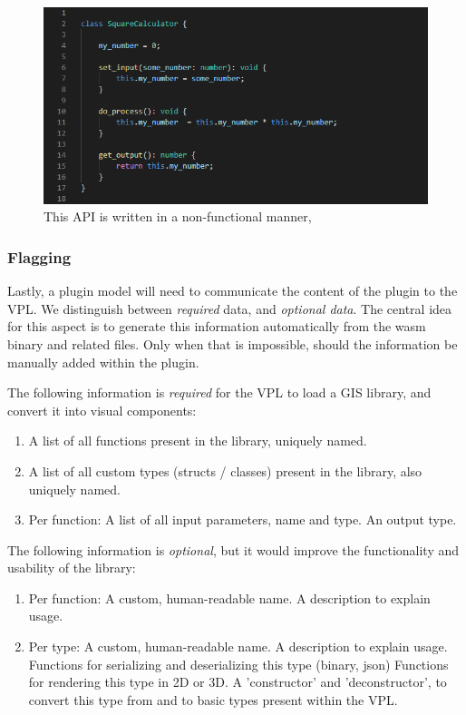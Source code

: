 \begin{figure}
  \centering
  \graphicspath{ {../../assets/images/6/3/} }
  \includegraphics[width=\linewidth]{ugly-oop.png}
  \caption[]{This API is written in a non-functional manner, }
  \label{fig:oop-considered-harmful}
\end{figure}

\subsubsection{Flagging}

Lastly, a plugin model will need to communicate the content of the plugin to the VPL. 
We distinguish between \emph{required} data, and \emph{optional data}.
The central idea for this aspect is to generate this information automatically from the wasm binary and related files.
Only when that is impossible, should the information be manually added within the plugin.

The following information is \emph{required} for the VPL to load a GIS library, and convert it into visual components:

\begin{enumerate}[-]
  \item A list of all functions present in the library, uniquely named.
  \item A list of all custom types (structs / classes) present in the library, also uniquely named.
  \item Per function:  
  \subitem A list of all input parameters, name and type.
  \subitem An output type.
\end{enumerate}

The following information is \emph{optional}, but it would improve the functionality and usability of the library:
\begin{enumerate}[-]
  \item Per function:
  \subitem A custom, human-readable name.
  \subitem A description to explain usage.

  \item Per type:
  \subitem A custom, human-readable name.
  \subitem A description to explain usage.
  \subitem Functions for serializing and deserializing this type (binary, json)  
  \subitem Functions for rendering this type in 2D or 3D.
  \subitem A 'constructor' and 'deconstructor', to convert this type from and to basic types present within the VPL.  
\end{enumerate}

